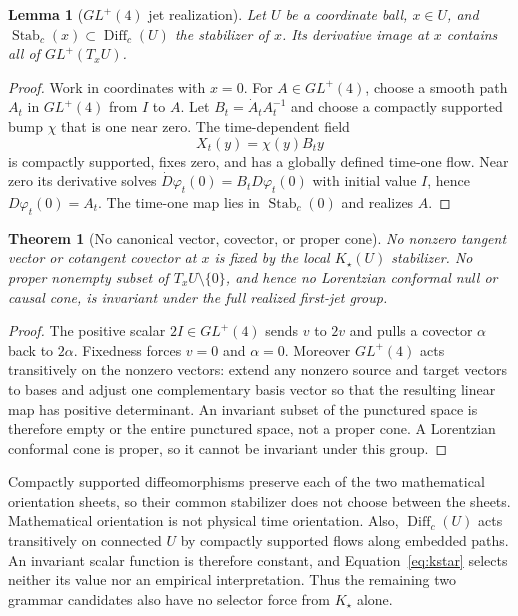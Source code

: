 \documentclass[11pt]{article}
\newtheorem{theorem}{Theorem}
\newtheorem{lemma}{Lemma}
\newcommand{\Diffc}{\operatorname{Diff}_{c}}
\newcommand{\Kstar}{K_{\star}}
\begin{document}
\begin{lemma}[$GL^{+}(4)$ jet realization]
Let $U$ be a coordinate ball, $x\in U$, and
$\operatorname{Stab}_{c}(x)\subset\Diffc(U)$ the stabilizer of $x$.  Its
derivative image at $x$ contains all of $GL^{+}(T_{x}U)$.
\end{lemma}

\begin{proof}
Work in coordinates with $x=0$.  For $A\in GL^{+}(4)$, choose a smooth path
$A_t$ in $GL^{+}(4)$ from $I$ to $A$.  Let
$B_t=\dot A_tA_t^{-1}$ and choose a compactly supported bump $\chi$ that is
one near zero.  The time-dependent field
\[
X_t(y)=\chi(y)B_ty
\]
is compactly supported, fixes zero, and has a globally defined time-one flow.
Near zero its derivative solves
$\dot D\varphi_t(0)=B_tD\varphi_t(0)$ with initial value $I$, hence
$D\varphi_t(0)=A_t$.  The time-one map lies in
$\operatorname{Stab}_{c}(0)$ and realizes $A$.
\end{proof}

\begin{theorem}[No canonical vector, covector, or proper cone]
No nonzero tangent vector or cotangent covector at $x$ is fixed by the local
$\Kstar(U)$ stabilizer.  No proper nonempty subset of
$T_xU\setminus\{0\}$, and hence no Lorentzian conformal null or causal cone,
is invariant under the full realized first-jet group.
\end{theorem}

\begin{proof}
The positive scalar $2I\in GL^{+}(4)$ sends $v$ to $2v$ and pulls a covector
$\alpha$ back to $2\alpha$.  Fixedness forces $v=0$ and $\alpha=0$.
Moreover $GL^{+}(4)$ acts transitively on the nonzero vectors: extend any
nonzero source and target vectors to bases and adjust one complementary basis
vector so that the resulting linear map has positive determinant.  An
invariant subset of the punctured space is therefore empty or the entire
punctured space, not a proper cone.  A Lorentzian conformal cone is proper, so
it cannot be invariant under this group.
\end{proof}

Compactly supported diffeomorphisms preserve each of the two mathematical
orientation sheets, so their common stabilizer does not choose between the
sheets.  Mathematical orientation is not physical time orientation.  Also,
$\Diffc(U)$ acts transitively on connected $U$ by compactly supported flows
along embedded paths.  An invariant scalar function is therefore constant,
and Equation~\eqref{eq:kstar} selects neither its value nor an empirical
interpretation.  Thus the remaining two grammar candidates also have no
selector force from $\Kstar$ alone.
\end{document}
